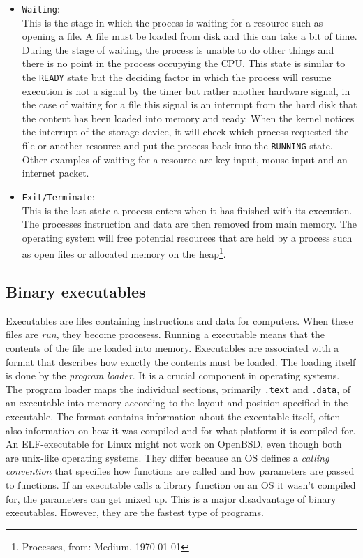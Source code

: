 \begin{itemize}
\item \texttt{Waiting}: \\
This is the stage in which the process is waiting for a resource such as opening a file. A file must be loaded from disk and this can take a bit of time.
During the stage of waiting, the process is unable to do other things and there is no point in the process occupying the CPU. This state is similar
to the \texttt{READY} state but the deciding factor in which the process will resume execution is not a signal by the timer but rather another hardware
signal, in the case of waiting for a file this signal is an interrupt from the hard disk that the content has been loaded into memory and ready. When
the kernel notices the interrupt of the storage device, it will check which process requested the file or another resource and put the process back into
the \texttt{RUNNING} state. Other examples of waiting for a resource are key input, mouse input and an internet packet.
\item \texttt{Exit/Terminate}: \\
This is the last state a process enters when it has finished with its execution. The processes instruction and data are then removed
from main memory. The operating system will free potential resources that are held by a process such as open files or allocated memory on the
heap\footnote{Processes, from: Medium, \today }.

\end{itemize}

\subsection{Binary executables}

Executables are files containing instructions and data for computers. When these files are \textit{run}, they
become procesess. Running a executable means that the contents of the file are loaded into memory. Executables
are associated with a format that describes how exactly the contents must be loaded. The loading itself
is done by the \textit{program loader}. It is a crucial component in operating systems. The program loader
maps the individual sections, primarily \texttt{.text} and \texttt{.data}, of an executable into memory according to the layout and position
specified in the executable. The format contains information about the executable itself, often also information on
how it was compiled and for what platform it is compiled for. An ELF-executable for Linux might not work on OpenBSD,
even though both are unix-like operating systems. They differ because an OS defines a \textit{calling convention} that
specifies how functions are called and how parameters are passed to functions. If an executable calls a library function on
an OS it wasn't compiled for, the parameters can get mixed up. This is a major disadvantage of binary executables. However,
they are the fastest type of programs.


